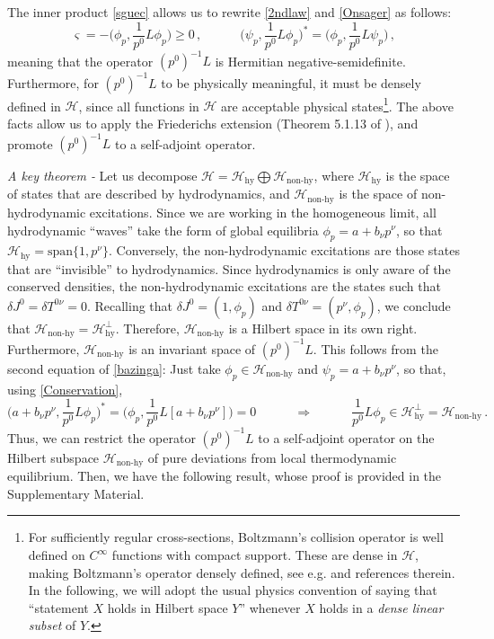 \documentclass[a4paper, amsfonts, amssymb, amsmath, reprint, showkeys, nofootinbib, twoside, onecolumn,notitlepage,,longbibliography]{revtex4-2}
\newcommand{\spc}{\quad \quad \quad}
\theoremstyle{definition}
\theoremstyle{theorem}
\theoremstyle{corollary}
\begin{document}
The inner product \eqref{sguec} allows us to rewrite  \eqref{2ndlaw} and \eqref{Onsager} as follows:
 \begin{equation}\label{bazinga}
    \varsigma= -\bigg(\phi_p , \dfrac{1}{p^0}L \phi_p \bigg)\geq 0 \, , \spc \bigg(\psi_p , \dfrac{1}{p^0}L \phi_p \bigg)^*= \bigg(\phi_p, \dfrac{1}{p^0}L\psi_p \bigg) \, ,
\end{equation}
meaning that the operator $(p^0)^{-1} L$ is Hermitian negative-semidefinite. Furthermore, for $(p^0)^{-1} L$ to be physically meaningful, it must be densely defined in $\mathcal{H}$, since all functions in $\mathcal{H}$ are acceptable physical states\footnote{For sufficiently regular cross-sections, Boltzmann's collision operator is well defined on $C^\infty$ functions with compact support. These are dense in $\mathcal{H}$, making Boltzmann's operator densely defined, see e.g. \cite{Dudynski1988,Strain2010,Speck2011} and references therein. In the following, we will adopt the usual physics convention of saying that  ``statement $X$ holds in Hilbert space $Y$'' whenever $X$ holds in a \textit{dense linear subset} of $Y$.}. The above facts allow us to apply the Friederichs extension (Theorem 5.1.13 of \cite{Pedersenbook}), and promote $(p^0)^{-1}L$ to a self-adjoint operator.




\noindent \textit{A key theorem -} Let us decompose $\mathcal{H}=\mathcal{H}_{\text{hy}} \bigoplus \mathcal{H}_{\text{non-hy}}$, where $\mathcal{H}_{\text{hy}}$ is the space of states that are described by hydrodynamics, and $\mathcal{H}_{\text{non-hy}}$ is the space of non-hydrodynamic excitations. Since we are working in the homogeneous limit, all hydrodynamic ``waves'' take the form of global equilibria $\phi_p=a+b_\nu p^\nu$, so that $\mathcal{H}_{\text{hy}}=\text{span}\{1,p^\nu\}$.
Conversely, the non-hydrodynamic excitations are those states that are ``invisible'' to hydrodynamics. Since hydrodynamics is only aware of the conserved densities, the non-hydrodynamic excitations are the states such that $\delta J^0=\delta T^{0\nu}=0$. Recalling that $\delta J^0=(1,\phi_p)$ and $\delta T^{0\nu}=(p^\nu,\phi_p)$, we conclude that $\mathcal{H}_{\text{non-hy}}=\mathcal{H}_{\text{hy}}^\perp$.
Therefore, $\mathcal{H}_{\text{non-hy}}$ is a Hilbert space in its own right. Furthermore, $\mathcal{H}_{\text{non-hy}}$ is an invariant space of $(p^0)^{-1}L$. This follows from the second equation of \eqref{bazinga}: Just take $\phi_p \in \mathcal{H}_{\text{non-hy}}$ and $\psi_p=a+b_\nu p^\nu$, so that, using \eqref{Conservation},
\begin{equation}
  \bigg(a{+}b_\nu p^\nu , \dfrac{1}{p^0}L \phi_p \bigg)^*= \bigg(\phi_p, \dfrac{1}{p^0}L[a{+}b_\nu p^\nu]  \bigg) =0 \spc \Longrightarrow  \spc  \frac{1}{p^0} L \phi_p \in \mathcal{H}_{\text{hy}}^\perp=\mathcal{H}_{\text{non-hy}} \, .
\end{equation}
Thus, we can restrict the operator $(p^0)^{-1} L$ to a self-adjoint operator on the Hilbert subspace $\mathcal{H}_{\text{non-hy}}$ of pure deviations from local thermodynamic equilibrium. Then, we have the following result, whose proof is provided in the Supplementary Material.
\end{document}
